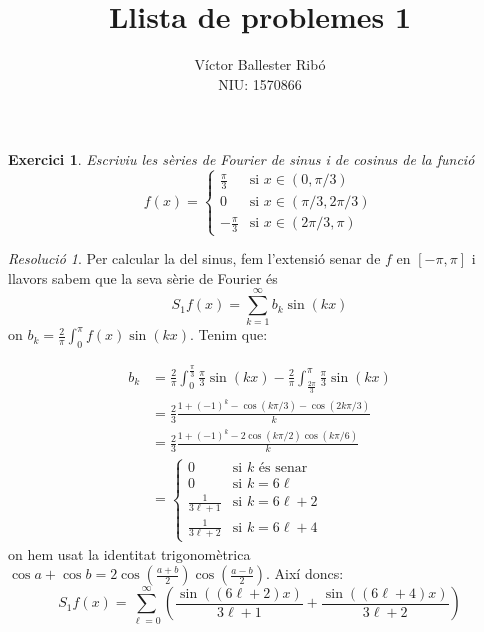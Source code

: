 \documentclass[10pt,a4paper]{article}
\title{\bfseries\Large Llista de problemes 1}
\author{Víctor Ballester Ribó\\NIU: 1570866}
\date{\parbox{\linewidth}{\centering
  Anàlisi Harmònica\endgraf
  Grau en Matemàtiques\endgraf
  Universitat Autònoma de Barcelona\endgraf
  Febrer de 2023}}
\newtheorem{exercici}{Exercici}
\theoremstyle{definition}
\theoremstyle{remark}
\newtheorem*{res}{Resolució}
\begin{document}
\maketitle
\begin{exercici}
  Escriviu les sèries de Fourier de sinus i de cosinus de la funció
  \begin{equation*}
    f(x)=\begin{cases}
      \frac{\pi}{3}  & \text{si } x\in(0,\pi/3)      \\
      0              & \text{si } x\in(\pi/3,2\pi/3) \\
      -\frac{\pi}{3} & \text{si } x\in(2\pi/3,\pi)
    \end{cases}
  \end{equation*}
\end{exercici}
\begin{res}
  Per calcular la del sinus, fem l'extensió senar de $f$ en $[-\pi,\pi]$ i llavors sabem que la seva sèrie de Fourier és $$S_1f(x)=\sum_{k=1}^{\infty}b_k\sin(kx)$$ on $b_k=\frac{2}{\pi}\int_0^\pi f(x)\sin(kx)$. Tenim que:

  \begin{align*}
    b_k & =\frac{2}{\pi}\int_0^{\frac{\pi}{3}} \frac{\pi}{3}\sin(kx)-\frac{2}{\pi}\int_{\frac{2\pi}{3}}^{\pi} \frac{\pi}{3}\sin(kx) \\
        & =\frac{2}{3}\frac{1+{(-1)}^k-\cos(k\pi/3)-\cos(2k\pi/3)}{k}                                                               \\
        & =\frac{2}{3}\frac{1+{(-1)}^k-2\cos(k\pi/2)\cos(k\pi/6)}{k}                                                                \\
        & =\begin{cases}
             0                                & \text{si $k$ és senar}  \\
             0                                & \text{si $k=6\ell$}     \\
             \displaystyle\frac{1}{3\ell + 1} & \text{si $k=6\ell + 2$} \\
             \displaystyle\frac{1}{3\ell + 2} & \text{si $k=6\ell + 4$}
           \end{cases}
  \end{align*}
  on hem usat la identitat trigonomètrica $\cos a+\cos b=2\cos\left(\frac{a+b}{2}\right)\cos\left(\frac{a-b}{2}\right)$. Així doncs: $$S_1f(x)=\sum_{\ell = 0}^\infty\left(\frac{\sin((6\ell + 2)x)}{3\ell + 1} + \frac{\sin((6\ell + 4)x)}{3\ell + 2} \right)$$


\end{res}
\end{document}
